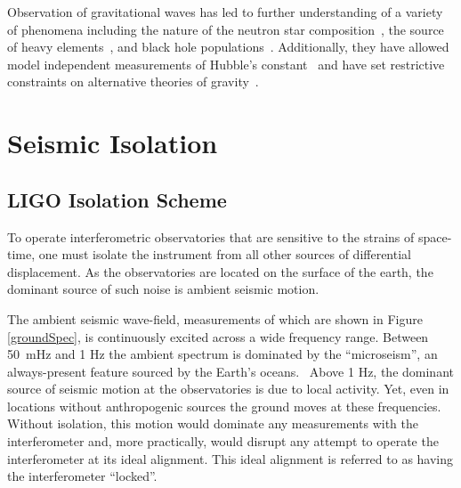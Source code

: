 \documentclass [12pt, proquest]{uwthesis}[2019]
\begin{document}
Observation of gravitational waves has led to further understanding of a variety of phenomena including the nature of the neutron star composition~\cite{NSEoS}, the source of heavy elements~\cite{heavyElements}, and black hole populations~\cite{GWTC}. Additionally, they have allowed model independent measurements of Hubble's constant~\cite{hubble1, hubble2} and have set restrictive constraints on alternative theories of gravity~\cite{speedGW}.

\section{Seismic Isolation}\label{seisIso}

\subsection{LIGO Isolation Scheme}

To operate interferometric observatories that are sensitive to the strains of space-time, one must isolate the instrument from all other sources of differential displacement. As the observatories are located on the surface of the earth, the dominant source of such noise is ambient seismic motion. 

The ambient seismic wave-field, measurements of which are shown in Figure \ref{groundSpec}, is continuously excited across a wide frequency range. Between 50~mHz and 1 Hz the ambient spectrum is dominated by the ``microseism'', an always-present feature sourced by the Earth's oceans.~\cite{micro} Above 1 Hz, the dominant source of seismic motion at the observatories is due to local activity. Yet, even in locations without anthropogenic sources the ground moves at these frequencies. Without isolation, this motion would dominate any measurements with the interferometer and, more practically, would disrupt any attempt to operate the interferometer at its ideal alignment. This ideal alignment is referred to as having the interferometer ``locked''.
\end{document}
